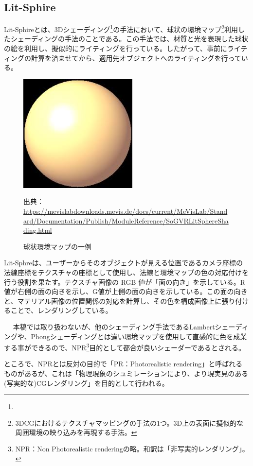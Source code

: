 \documentclass[dvipdfmx]{jsarticle}
\begin{document}
\subsection{Lit-Sphire}
Lit-Sphireとは、3Dシェーディング\footnote{}の手法において、球状の環境マップ\footnote{3DCGにおけるテクスチャマッピングの手法の1つ。3D上の表面に擬似的な周囲環境の映り込みを再現する手法。}利用したシェーディングの手法のことである。この手法では、材質と光を表現した球状の絵を利用し、擬似的にライティングを行っている。したがって、事前にライティングの計算を済ませてから、適用先オブジェクトへのライティングを行っている。
\begin{figure}[H]
  \centering
  \includegraphics[scale=0.4]{images/lit_demo.png}
  \caption{球状環境マップの一例}
  出典：\url{https://mevislabdownloads.mevis.de/docs/current/MeVisLab/Standard/Documentation/Publish/ModuleReference/SoGVRLitSphereShading.html}
\end{figure}
Lit-Sphreは、ユーザーからそのオブジェクトが見える位置であるカメラ座標の法線座標をテクスチャの座標として使用し、法線と環境マップの色の対応付けを行う役割を果たす。テクスチャ画像の RGB 値が「面の向き」を示している。R 値が右側の面の向きを示し、G値が上側の面の向きを示している。この面の向きと、マテリアル画像の位置関係の対応を計算し、その色を構成画像上に張り付けることで、レンダリングしている。\par
　
本稿では取り扱わないが、他のシェーディング手法であるLambertシェーディングや、Phongシェーディングとは違い環境マップを使用して直感的に色を成業する事ができるので、NPR\footnote{NPR：Non Photorealistic renderingの略。和訳は「非写実的レンダリング」。}目的として都合が良いシェーダーであるとされる。\par
ところで、NPRとは反対の目的で「PR：Photorealistic rendering」と呼ばれるものがあるが、これは「物理現象のシュミレーションにより、より現実見のある(写実的な)CGレンダリング」を目的として行われる。
\end{document}
